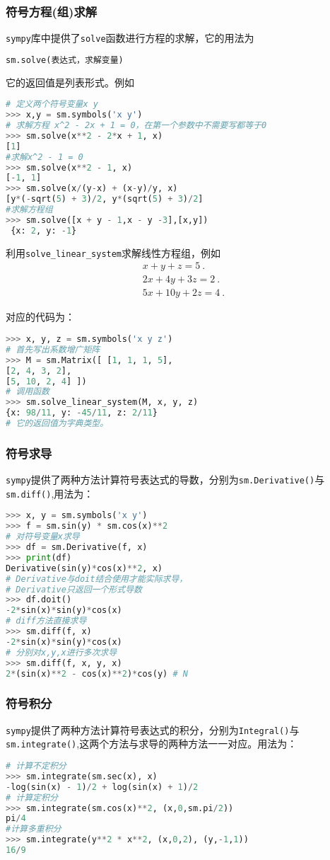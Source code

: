 \subsubsection{符号方程(组)求解}
\verb|sympy|库中提供了\verb|solve|函数进行方程的求解，它的用法为
\begin{lstlisting}[language=python]
sm.solve(表达式，求解变量)
\end{lstlisting}
它的返回值是列表形式。例如
\begin{lstlisting}[language=python]
# 定义两个符号变量x y
>>> x,y = sm.symbols('x y')
# 求解方程 x^2 - 2x + 1 = 0，在第一个参数中不需要写都等于0
>>> sm.solve(x**2 - 2*x + 1, x)
[1] 
#求解x^2 - 1 = 0
>>> sm.solve(x**2 - 1, x)
[-1, 1]
>>> sm.solve(x/(y-x) + (x-y)/y, x)
[y*(-sqrt(5) + 3)/2, y*(sqrt(5) + 3)/2]
#求解方程组
>>> sm.solve([x + y - 1,x - y -3],[x,y])
 {x: 2, y: -1}
\end{lstlisting}

利用\verb|solve_linear_system|求解线性方程组，例如
\begin{align}
x+y+z=5 ~.\\
2 x+4 y+3 z=2~. \\
5 x+10 y+2 z=4~.
\end{align}

对应的代码为：
\begin{lstlisting}[language=python]
>>> x, y, z = sm.symbols('x y z')
# 首先写出系数增广矩阵
>>> M = sm.Matrix([ [1, 1, 1, 5],
[2, 4, 3, 2],
[5, 10, 2, 4] ])
# 调用函数
>>> sm.solve_linear_system(M, x, y, z)
{x: 98/11, y: -45/11, z: 2/11}
# 它的返回值为字典类型。
\end{lstlisting}

\subsubsection{符号求导}
\verb|sympy|提供了两种方法计算符号表达式的导数，分别为\verb|sm.Derivative()|与\verb|sm.diff()|,用法为：
\begin{lstlisting}[language=python]
>>> x, y = sm.symbols('x y')
>>> f = sm.sin(y) * sm.cos(x)**2
# 对符号变量x求导
>>> df = sm.Derivative(f, x)
>>> print(df)
Derivative(sin(y)*cos(x)**2, x)
# Derivative与doit结合使用才能实际求导，
# Derivative只返回一个形式导数
>>> df.doit() 
-2*sin(x)*sin(y)*cos(x)
# diff方法直接求导
>>> sm.diff(f, x)
-2*sin(x)*sin(y)*cos(x)
# 分别对x,y,x进行多次求导
>>> sm.diff(f, x, y, x)
2*(sin(x)**2 - cos(x)**2)*cos(y) # N
\end{lstlisting}

\subsubsection{符号积分}
\verb|sympy|提供了两种方法计算符号表达式的积分，分别为\verb|Integral()|与\verb|sm.integrate()|,这两个方法与求导的两种方法一一对应。用法为：
\begin{lstlisting}[language=python]
# 计算不定积分
>>> sm.integrate(sm.sec(x), x)
-log(sin(x) - 1)/2 + log(sin(x) + 1)/2
# 计算定积分
>>> sm.integrate(sm.cos(x)**2, (x,0,sm.pi/2))
pi/4
#计算多重积分
>>> sm.integrate(y**2 * x**2, (x,0,2), (y,-1,1))
16/9
\end{lstlisting}

